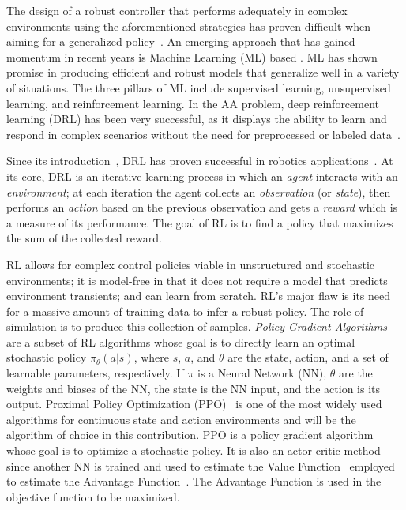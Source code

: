 \documentclass[12pt,twocolumn]{article}
\begin{document}
The design of a robust controller that performs adequately in complex environments using the aforementioned strategies has proven difficult when aiming for a generalized policy~\cite{Kuutti2019ASO}. An emerging approach that has gained momentum in recent years is Machine Learning (ML) based \cite{surveyRLrobotics2013}. ML has shown promise in producing efficient and robust models that generalize well in a variety of situations. The three pillars of ML include supervised learning, unsupervised learning, and reinforcement learning. In the AA problem, deep reinforcement learning (DRL) has been very successful, as it displays the ability to learn and respond in complex scenarios without the need for preprocessed or labeled data~\cite{VirtualToRealRL}.

Since its introduction~\cite{Mnih13}, DRL has proven successful in robotics applications~\cite{Levine2016,inHandManipulation2020}. At its core, DRL is an iterative learning process in which an \emph{agent} interacts with an \emph{environment}; at each iteration the agent collects an \emph{observation} (or \emph{state}), then performs an \emph{action} based on the previous observation and gets a \emph{reward} which is a measure of its performance. The goal of RL is to find a policy that maximizes the sum of the collected reward. 

RL allows for complex control policies viable in unstructured and stochastic environments; it is model-free in that it does not require a model that predicts environment transients; and can learn from scratch. RL's major flaw is its need for a massive amount of training data to infer a robust policy. The role of simulation is to produce this collection of samples. \emph{Policy Gradient Algorithms} are a subset of RL algorithms whose goal is to directly learn an optimal stochastic policy $\pi_\theta(a|s)$, where $s$, $a$, and $\theta$ are the state, action, and a set of learnable parameters, respectively. If $\pi$ is a Neural Network (NN), $\theta$ are the weights and biases of the NN, the state is the NN input, and the action is its output. Proximal Policy Optimization (PPO)~\cite{Schulman2017PPO} is one of the most widely used algorithms for continuous state and action environments and will be the algorithm of choice in this contribution. PPO is a policy gradient algorithm whose goal is to optimize a stochastic policy. It is also an actor-critic method since another NN is trained and used to estimate the Value Function~\cite{SuttonBarto1998RL} employed to estimate the Advantage Function~\cite{Kakade02approximatelyoptimal}. The Advantage Function is used in the objective function to be maximized.
\end{document}

